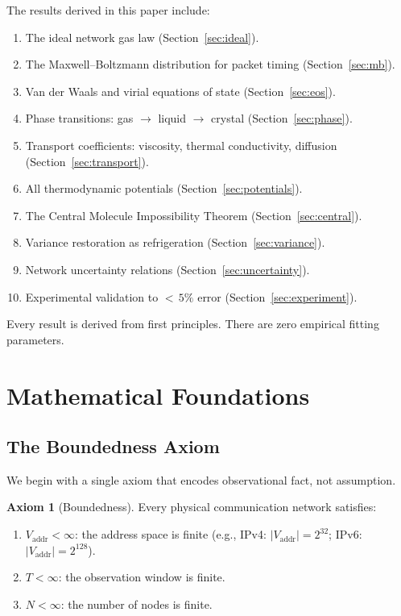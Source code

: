 \documentclass[11pt,twocolumn,a4paper]{article}
\theoremstyle{definition}
\newtheorem{axiom}[theorem]{Axiom}
\theoremstyle{remark}
\newcommand{\Vaddr}{V_{\mathrm{addr}}}
\begin{document}
The results derived in this paper include:
\begin{enumerate}[label=(\roman*)]
  \item The ideal network gas law (Section~\ref{sec:ideal}).
  \item The Maxwell--Boltzmann distribution for packet timing
        (Section~\ref{sec:mb}).
  \item Van der Waals and virial equations of state
        (Section~\ref{sec:eos}).
  \item Phase transitions: gas $\to$ liquid $\to$ crystal
        (Section~\ref{sec:phase}).
  \item Transport coefficients: viscosity, thermal conductivity, diffusion
        (Section~\ref{sec:transport}).
  \item All thermodynamic potentials (Section~\ref{sec:potentials}).
  \item The Central Molecule Impossibility Theorem
        (Section~\ref{sec:central}).
  \item Variance restoration as refrigeration
        (Section~\ref{sec:variance}).
  \item Network uncertainty relations
        (Section~\ref{sec:uncertainty}).
  \item Experimental validation to ${<}\,5\%$ error
        (Section~\ref{sec:experiment}).
\end{enumerate}

Every result is derived from first principles.  There are zero empirical
fitting parameters.

\section{Mathematical Foundations}\label{sec:foundations}

\subsection{The Boundedness Axiom}\label{sec:axiom}

We begin with a single axiom that encodes observational fact, not assumption.

\begin{axiom}[Boundedness]\label{ax:bounded}
Every physical communication network satisfies:
\begin{enumerate}[label=(\alph*)]
  \item $\Vaddr < \infty$: the address space is finite
        (e.g., IPv4: $|\Vaddr|=2^{32}$; IPv6: $|\Vaddr|=2^{128}$).
  \item $T < \infty$: the observation window is finite.
  \item $N < \infty$: the number of nodes is finite.
\end{enumerate}
\end{axiom}
\end{document}
